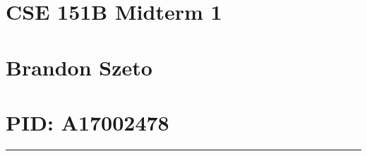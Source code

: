 \documentclass{cheatsheet}
\begin{document}
\section{CSE 151B Midterm 1}
\section{\normalsize Brandon Szeto}
\section{\normalsize PID: A17002478}

\vspace{2mm}
\hrule
\vspace{5mm}
\tiny










\end{document}
